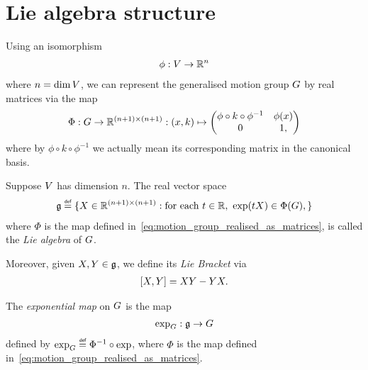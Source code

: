 \section{Lie algebra structure}

Using an isomorphism
\begin{align}
    \phi : V \to \mathbb{R}^n
\end{align}
where $n = \dim V$,
we can represent the generalised motion group $G$
by real matrices via the map
\begin{align}
    \Phi : G \to \mathbb{R}^{(n + 1) \times (n + 1)} :
        (x, k) \mapsto
            \begin{pmatrix}
                \phi \circ k \circ \phi^{-1} & \phi(x)\\
                0 & 1,
            \end{pmatrix}
    \label{eq:motion_group_realised_as_matrices}
\end{align}
where by $\phi \circ k \circ \phi^{-1}$ we actually mean its corresponding matrix in the canonical basis.

\begin{definition}
\label{definition:Lie_Algebra}
    Suppose $V$ has dimension $n$.
    The real vector space
    \begin{align*}
        \LieAlgebra \defeq
            \{
                X \in \R^{(n + 1) \times (n + 1)} :
                \text{for each}\
                t \in \R,\
                \exp(t X) \in \Phi(\Group),
            \}
    \end{align*}
    where $\Phi$ is the map defined in~\eqref{eq:motion_group_realised_as_matrices},
    is called the \emph{Lie algebra} of $G$.

    Moreover, given $X, Y \in \mathfrak{g}$, we define its \emph{Lie Bracket} via
    \begin{align*}
        [X, Y] = X Y - Y X.
    \end{align*}
\end{definition}

\begin{definition}
\label{definition:exponential_map}
    The \emph{exponential map} on $G$ is the map
    \begin{align*}
        \exp_G : \mathfrak{g} \to G
    \end{align*}
    defined by $\exp_\Group \defeq \Phi^{-1} \circ \exp$,
    where $\Phi$ is the map defined in~\eqref{eq:motion_group_realised_as_matrices}.
\end{definition}

